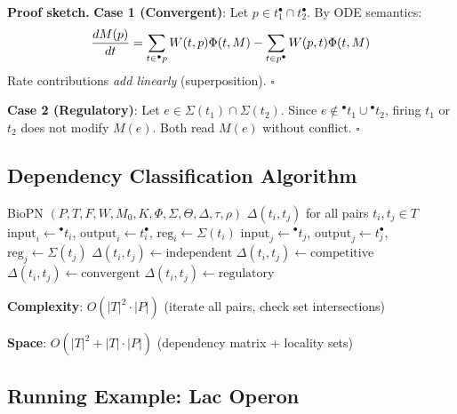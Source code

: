 \documentclass[twocolumn,11pt]{article}
\newcommand{\preset}[1]{\ensuremath{{}^{\bullet}#1}}
\newcommand{\postset}[1]{\ensuremath{#1^{\bullet}}}
\newcommand{\RegSet}[1]{\ensuremath{\Sigma(#1)}}
\begin{document}
\textbf{Proof sketch.}
\textbf{Case 1 (Convergent)}: Let $p \in \postset{t_1} \cap \postset{t_2}$. By ODE semantics:
\begin{equation}
\small
\frac{dM(p)}{dt} = \sum_{t \in \preset{p}} W(t,p) \Phi(t, M) - \sum_{t \in \postset{p}} W(p,t) \Phi(t, M)
\end{equation}
Rate contributions \emph{add linearly} (superposition). $\square$

\textbf{Case 2 (Regulatory)}: Let $e \in \RegSet{t_1} \cap \RegSet{t_2}$. Since $e \notin \preset{t_1} \cup \preset{t_2}$, firing $t_1$ or $t_2$ does not modify $M(e)$. Both read $M(e)$ without conflict. $\square$

\subsection{Dependency Classification Algorithm}

\begin{algorithm}[t]
\caption{Classify Transition Dependencies}
\label{alg:classify}
\begin{algorithmic}[1]
\REQUIRE BioPN $(P, T, F, W, M_0, K, \Phi, \Sigma, \Theta, \Delta, \tau, \rho)$
\ENSURE $\Delta(t_i, t_j)$ for all pairs $t_i, t_j \in T$
    \STATE $\text{input}_i \gets \preset{t_i}$, $\text{output}_i \gets \postset{t_i}$, $\text{reg}_i \gets \RegSet{t_i}$
    \STATE $\text{input}_j \gets \preset{t_j}$, $\text{output}_j \gets \postset{t_j}$, $\text{reg}_j \gets \RegSet{t_j}$
        \STATE $\Delta(t_i, t_j) \gets \text{independent}$
        \STATE $\Delta(t_i, t_j) \gets \text{competitive}$
        \STATE $\Delta(t_i, t_j) \gets \text{convergent}$
        \STATE $\Delta(t_i, t_j) \gets \text{regulatory}$
    \ENDIF
\ENDFOR
\end{algorithmic}
\end{algorithm}

\textbf{Complexity}: $O(|T|^2 \cdot |P|)$ (iterate all pairs, check set intersections)

\textbf{Space}: $O(|T|^2 + |T| \cdot |P|)$ (dependency matrix + locality sets)

\subsection{Running Example: Lac Operon}
\end{document}
